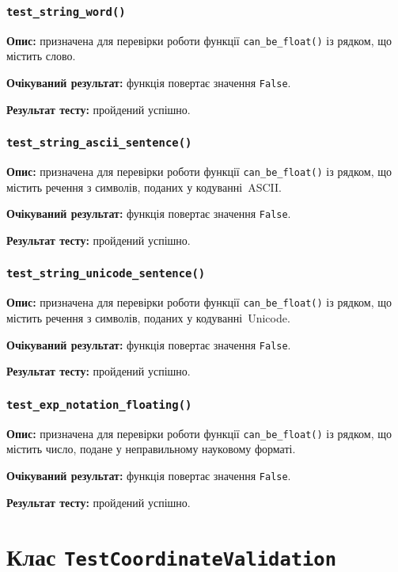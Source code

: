 \documentclass[a4paper,oneside,DIV=12,12pt]{scrartcl}
\newcommand{\classname}[1]{\texttt{#1}}
\newcommand{\funcname}[1]{\texttt{#1}}
\newcommand{\caseattrib}[1]{\noindent\textbf{#1}}
\newcommand{\printfalse}{\texttt{False}}
\begin{document}
			\subsubsection{\funcname{test\_string\_word()}}
				\caseattrib{Опис:} призначена для перевірки роботи функції \verb|can_be_float()| із рядком, що містить слово.
				
				\caseattrib{Очікуваний результат:} функція повертає значення \printfalse.
				
				\caseattrib{Результат тесту:} пройдений успішно.
				
			\subsubsection{\funcname{test\_string\_ascii\_sentence()}}
				\caseattrib{Опис:} призначена для перевірки роботи функції \verb|can_be_float()| із рядком, що містить речення з символів, поданих у кодуванні~ASCII.
				
				\caseattrib{Очікуваний результат:} функція повертає значення \printfalse.
				
				\caseattrib{Результат тесту:} пройдений успішно.
				
			\subsubsection{\funcname{test\_string\_unicode\_sentence()}}
				\caseattrib{Опис:} призначена для перевірки роботи функції \verb|can_be_float()| із рядком, що містить речення з символів, поданих у кодуванні~Unicode.
				
				\caseattrib{Очікуваний результат:} функція повертає значення \printfalse.
				
				\caseattrib{Результат тесту:} пройдений успішно.
				
			\subsubsection{\funcname{test\_exp\_notation\_floating()}}
				\caseattrib{Опис:} призначена для перевірки роботи функції \verb|can_be_float()| із рядком, що містить число, подане у неправильному науковому форматі.
				
				\caseattrib{Очікуваний результат:} функція повертає значення \printfalse.
				
				\caseattrib{Результат тесту:} пройдений успішно.
		
	\section{Клас \classname{TestCoordinateValidation}}
\end{document}
